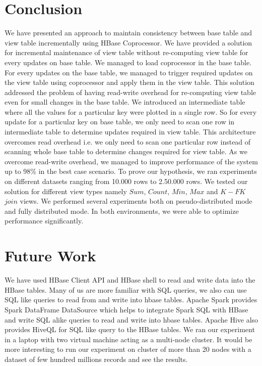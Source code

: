 \documentclass[11pt,a4paper,bibtotoc,idxtotoc,headsepline,footsepline,footexclude,BCOR12mm,DIV13]{scrbook}
\begin{document}
\chapter{Conclusion}
\label{Conclusion}
We have presented an approach to maintain consistency between base table and view table incrementally using HBase Coprocessor. We have provided a solution for incremental maintenance of view table without re-computing view table for every updates on base table. We managed to load coprocessor in the base table. For every updates on the base table, we managed to trigger required updates on the view table using coprocessor and apply them in the view table. This solution addressed the problem of having read-write overhead for re-computing view table even for small changes in the base table. We introduced an intermediate table where all the values for a particular key were plotted in a single row. So for every update for a particular key on base table, we only need to scan one row in intermediate table to determine updates required in view table. This architecture overcomes read overhead i.e. we only need to scan one particular row instead of scanning whole base table to determine changes required for view table. As we overcome read-write overhead, we managed to improve performance of the system up to 98\% in the best case scenario. To prove our hypothesis, we ran experiments on different datasets ranging from 10.000 rows to 2.50.000 rows. We tested our solution for different view types namely $Sum$, $Count$, $Min$, $Max$ and $K-FK$ $join$ views. We performed several experiments both on pseudo-distributed mode and fully distributed mode. In both environments, we were able to optimize performance significantly. 


\chapter{Future Work}
\label{Future Work}
We have used HBase Client API and HBase shell to read and write data into the HBase tables. Many of us are more familiar with SQL queries, we also can use SQL like queries to read from and write into hbase tables. Apache Spark provides Spark DataFrame DataSource which helps to integrate Spark SQL with HBase and write SQL alike queries to read and write into hbase tables. Apache Hive also provides HiveQL for SQL like query to the HBase tables. 
\newline
We ran our experiment in a laptop with two virtual machine acting as a multi-node cluster. It would be more interesting to run our experiment on cluster of more than 20 nodes with a  dataset of few hundred millions records and see the results.
\end{document}
